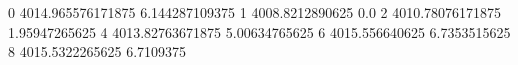 0 4014.965576171875 6.144287109375
1 4008.8212890625 0.0
2 4010.78076171875 1.95947265625
4 4013.82763671875 5.00634765625
6 4015.556640625 6.7353515625
8 4015.5322265625 6.7109375
